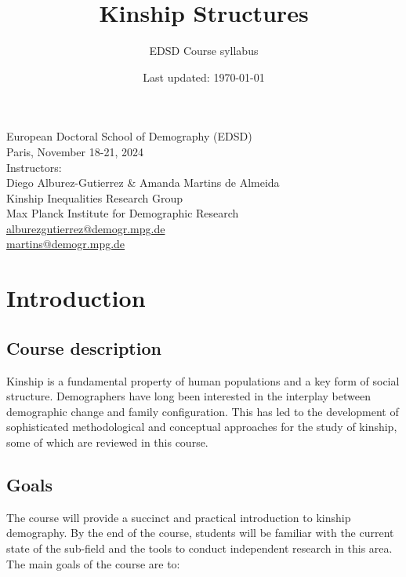 ﻿\documentclass{article}
\title{Kinship Structures}
\author{EDSD Course syllabus}
\date{Last updated: \today}
\begin{document}
\maketitle

\noindent
European Doctoral School of Demography (EDSD)\\
Paris, November 18-21, 2024\\

\noindent
Instructors:\\
Diego Alburez-Gutierrez \& Amanda Martins de Almeida\\
Kinship Inequalities Research Group\\
Max Planck Institute for Demographic Research\\
\href{mailto:alburezgutierrez@demogr.mpg.de}{alburezgutierrez@demogr.mpg.de}\\
\href{mailto:martins@demogr.mpg.de}{martins@demogr.mpg.de}\\


\section{Introduction}

\subsection{Course description}

Kinship is a fundamental property of human populations and a key form of social structure.
Demographers have long been interested in the interplay between demographic change and family configuration.
This has led to the development of sophisticated methodological and conceptual approaches for the study of kinship, some of which are reviewed in this course. 

\subsection{Goals}

The course will provide a succinct and practical introduction to kinship demography. 
By the end of the course, students will be familiar with the current state of the sub-field and the tools to conduct independent research in this area. 
The main goals of the course are to:
\end{document}
